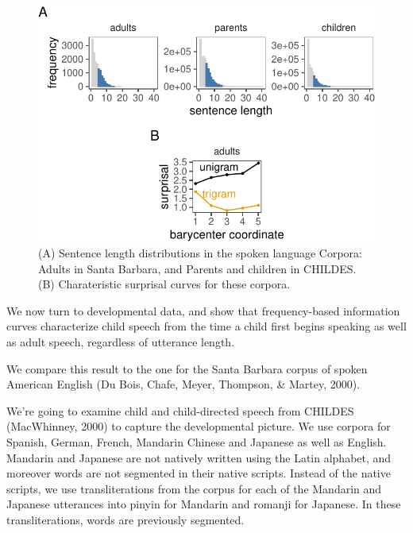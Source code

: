 \documentclass[10pt, letterpaper]{article}
\newenvironment{CodeChunk}{}{}
\begin{document}
\begin{CodeChunk}
\begin{figure}[tb]

{\centering \includegraphics{figs/spoken_figs-1} 

}

\caption[(A) Sentence length distributions in the spoken language Corpora]{(A) Sentence length distributions in the spoken language Corpora: Adults in Santa Barbara, and Parents and children in CHILDES. (B) Charateristic surprisal curves for these corpora.}\label{fig:spoken_figs}
\end{figure}
\end{CodeChunk}

We now turn to developmental data, and show that frequency-based
information curves characterize child speech from the time a child first
begins speaking as well as adult speech, regardless of utterance length.

We compare this result to the one for the Santa Barbara corpus of spoken
American English (Du Bois, Chafe, Meyer, Thompson, \& Martey, 2000).

We're going to examine child and child-directed speech from CHILDES
(MacWhinney, 2000) to capture the developmental picture. We use corpora
for Spanish, German, French, Mandarin Chinese and Japanese as well as
English. Mandarin and Japanese are not natively written using the Latin
alphabet, and moreover words are not segmented in their native scripts.
Instead of the native scripts, we use transliterations from the corpus
for each of the Mandarin and Japanese utterances into pinyin for
Mandarin and romanji for Japanese. In these transliterations, words are
previously segmented.
\end{document}
